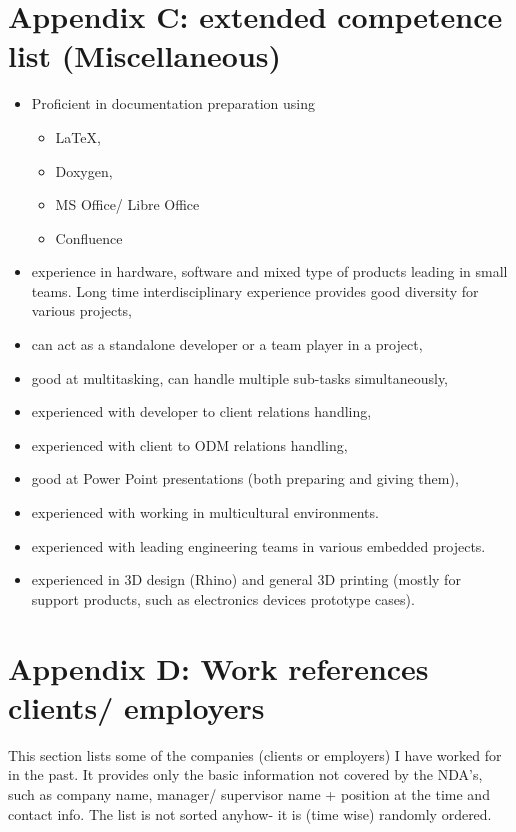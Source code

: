 \documentclass{tccv}
\begin{document}
\clearpage

\section{Appendix C: extended competence list (Miscellaneous)}

\begin{itemize}
	\item Proficient in documentation preparation using 
	\begin{itemize}
		\item \LaTeX, 
		\item Doxygen,
		\item MS Office/ Libre Office
		\item Confluence
	\end{itemize}
	\item experience in hardware, software and mixed type of products leading in small teams. Long time interdisciplinary experience provides good diversity for various projects,
	\item can act as a standalone developer or a team player in a project,
	\item good at multitasking, can handle multiple sub-tasks simultaneously,
	\item experienced with developer to client relations handling,
	\item experienced with client to ODM relations handling,
	\item good at Power Point presentations (both preparing and giving them),
	\item experienced with working in multicultural environments.
	\item experienced with leading engineering teams in various embedded projects.
	\item experienced in 3D design (Rhino) and general 3D printing (mostly for support products, such as electronics devices prototype cases).
	 
\end{itemize}

\clearpage

\section{Appendix D: Work references clients/ employers}

This section lists some of the companies (clients or employers) I have worked for in the past. It provides only the basic information not covered by the NDA's, such as company name, manager/ supervisor name + position at the time and contact info. The list is not sorted anyhow- it is (time wise) randomly ordered. \\
\end{document}
